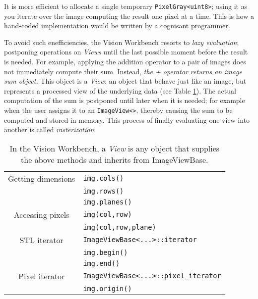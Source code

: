 It is more efficient to allocate a single temporary
\verb#PixelGray<uint8>#; using it as you iterate over the image
computing the result one pixel at a time.  This is how a hand-coded
implementation would be written by a cognisant programmer.

To avoid such enefficiencies, the Vision Workbench resorts to {\em
  lazy evaluation}; postponing operations on {\em Views} until the
last possible moment before the result is needed.  For example,
applying the addition operator to a pair of images does not
immediately compute their sum.  Instead, {\em the + operator returns
  an image sum object.}  This object is a {\em View}: an object that
behave just like an image, but represents a processed view of the
underlying data (see Table \ref{tbl:view-concept}).  The actual
computation of the sum is postponed until later when it is needed; for
example when the user assigns it to an \verb#ImageView<>#, thereby
causing the sum to be computed and stored in memory.  This process of
finally evaluating one view into another is called {\em
  rasterization}.
  \begin{table}[tb]\begin{centering}
 \begin{tabular}{|c|l|} \hline
   Getting dimensions & 	\verb#img.cols()#    \\
                      &   \verb#img.rows()#   \\
                      &   \verb#img.planes()# \\
   \hline
   Accessing pixels  & \verb#img(col,row)# \\
                     & \verb#img(col,row,plane)# \\
   \hline
   STL iterator      & \verb#ImageViewBase<...>::iterator# \\
                     & \verb#img.begin()# \\
                     & \verb#img.end()#\\
   \hline
   Pixel iterator   & \verb#ImageViewBase<...>::pixel_iterator# \\ 
                    & \verb#img.origin()# \\
   \hline
 \end{tabular}
 \caption{In the Vision Workbench, a {\em View} is any object that supplies the above methods and inherits from ImageViewBase.}
 \label{tbl:view-concept}
 \end{centering}\end{table}

